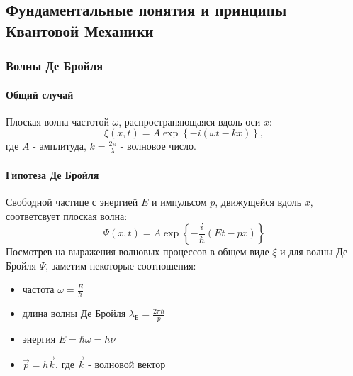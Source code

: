 \subsection{Фундаментальные понятия и принципы Квантовой Механики}

\subsubsection{Волны Де Бройля}

\paragraph{Общий случай} Плоская волна частотой $\omega$, распространяющаяся вдоль оси $x$:
\begin{equation*}
	\xi(x,t) = A \exp \left\{-i(\omega t -kx)\right\},
\end{equation*}
где $A$ - амплитуда, $k=\frac{2\pi}{\lambda}$ - волновое число.

\paragraph{Гипотеза Де Бройля} 
Свободной частице с энергией $E$ и импульсом $p$, движущейся вдоль $x$, соответсвует плоская волна:
\begin{equation*}
	\Psi(x, t) = A \exp \left\{-\frac{i}{\hbar}(E t - px)\right\}
\end{equation*}
Посмотрев на выражения волновых процессов в общем виде $\xi$ и для волны Де Бройля $\Psi$, заметим некоторые соотношения:
\begin{itemize}
	\item частота $\omega = \frac{E}{\hbar}$
	\item длина волны Де Бройля $\lambda_{\text{Б}}=\frac{2\pi\hbar}{p}$
	\item энергия $E = \hbar \omega = h\nu$
	\item $\vec p = h \vec k$, где $\vec k$ - волновой вектор
\end{itemize}

